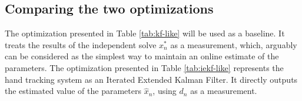\subsection{Comparing the two optimizations}
The optimization presented in Table \ref{tab:kf-like} will be used as a baseline. It treats the results of the independent solve $x_n^*$ as a measurement, which, arguably can be considered as the simplest way to maintain an online estimate of the parameters. 
The optimization presented in Table \ref{tab:iekf-like} represents the hand tracking system as an Iterated Extended Kalman Filter. It directly outputs the estimated value of the parameters $\hat{x}_n$, using $d_n$ as a measurement.
